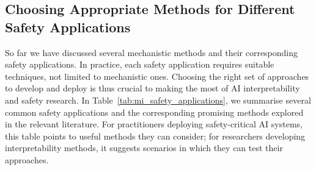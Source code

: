 \subsection{Choosing Appropriate Methods for Different Safety Applications}
So far we have discussed several mechanistic methods and their corresponding safety applications. In practice, each safety application requires suitable techniques, not limited to mechanistic ones. Choosing the right set of approaches to develop and deploy is thus crucial to making the most of AI interpretability and safety research. In Table~\ref{tab:mi_safety_applications}, we summarise several common safety applications and the corresponding promising methods explored in the relevant literature. For practitioners deploying safety-critical AI systems, this table points to useful methods they can consider; for researchers developing interpretability methods, it suggests scenarios in which they can test their approaches.

